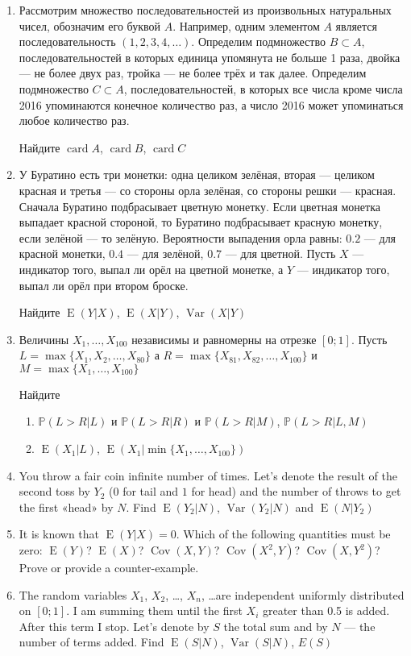 \documentclass[12pt]{article}
\DeclareMathOperator{\card}{card}
\DeclareMathOperator{\Cov}{Cov}
\DeclareMathOperator{\Var}{Var}
\DeclareMathOperator{\E}{E}
\renewcommand{\P}{\mathbb{P}}
\begin{document}
\begin{enumerate}

\item Рассмотрим множество последовательностей из произвольных натуральных чисел, обозначим его буквой $A$. Например, одним элементом $A$ является последовательность $(1, 2, 3, 4, \ldots)$. Определим подмножество $B \subset A$, последовательностей в которых единица упомянута не больше 1 раза, двойка — не более двух раз, тройка — не более трёх и так далее. Определим подмножество $C \subset A$, последовательностей, в которых все числа кроме числа 2016 упоминаются конечное количество раз, а число 2016 может упоминаться любое количество раз.

Найдите $\card A$, $\card B$, $\card C$

\item У Буратино есть три монетки: одна целиком зелёная, вторая — целиком красная и третья — со стороны орла зелёная, со стороны решки — красная. Сначала Буратино подбрасывает цветную монетку. Если цветная монетка выпадает красной стороной, то Буратино подбрасывает красную монетку, если зелёной — то зелёную. Вероятности выпадения орла равны: $0.2$ — для красной монетки, $0.4$ — для зелёной, $0.7$ — для цветной. Пусть $X$ — индикатор того, выпал ли орёл на цветной монетке, а $Y$ — индикатор того, выпал ли орёл при втором броске.

Найдите $\E(Y|X)$, $\E(X|Y)$, $\Var(X|Y)$

\item Величины $X_{1}, \ldots,  X_{100}$ независимы и равномерны на  отрезке $ [0;1] $. Пусть $L=\max\{X_{1},X_{2},\ldots, X_{80}\}$ а $R=\max\{X_{81},X_{82},\ldots,X_{100}\}$ и $M=\max\{X_{1},\ldots,X_{100}\}$

Найдите
\begin{enumerate}
\item $ \P(L>R|L)$ и $ \P(L>R|R) $ и $ \P(L>R|M)$, $\P(L>R|L,M) $
\item $\E( X_1 | L )$, $\E( X_1 | \min \{ X_1, \ldots, X_{100} \})$
\end{enumerate}

\item You throw a fair coin infinite number of times. Let's denote the result of the second toss by $Y_2$ ($0$ for tail and $1$ for head) and the number of throws to get the first «head» by $N$. Find $\E(Y_2|N)$, $\Var(Y_2|N)$ and $\E(N|Y_2)$

\item It is known that $\E(Y|X)=0$. Which of the following quantities must be zero: $\E(Y)$? $\E(X)$? $\Cov(X,Y)$? $\Cov(X^2,Y)$? $\Cov(X,Y^2)$? Prove or provide a counter-example.

\item The random variables $X_1$, $X_2$, \ldots, $X_n$, \ldots are independent uniformly distributed on $[0; 1]$. I am summing them until the first $X_i$ greater than 0.5 is added. After this term I stop. Let’s denote by $S$ the total sum and by $N$ — the number of terms added. Find $\E(S|N)$, $\Var(S|N)$, $E(S)$


\end{enumerate}
\end{document}
